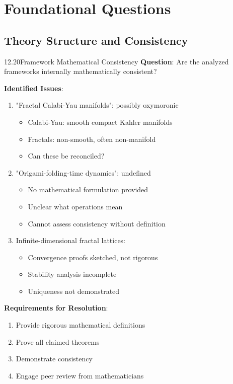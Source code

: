 \section{Foundational Questions}

\subsection{Theory Structure and Consistency}

\begin{openproblem}{12.20}{Framework Mathematical Consistency}
\textbf{Question}: Are the analyzed frameworks internally mathematically consistent?

\textbf{Identified Issues}:
\begin{enumerate}
    \item "Fractal Calabi-Yau manifolds": possibly oxymoronic
    \begin{itemize}
        \item Calabi-Yau: smooth compact Kahler manifolds
        \item Fractals: non-smooth, often non-manifold
        \item Can these be reconciled?
    \end{itemize}

    \item "Origami-folding-time dynamics": undefined
    \begin{itemize}
        \item No mathematical formulation provided
        \item Unclear what operations mean
        \item Cannot assess consistency without definition
    \end{itemize}

    \item Infinite-dimensional fractal lattices:
    \begin{itemize}
        \item Convergence proofs sketched, not rigorous
        \item Stability analysis incomplete
        \item Uniqueness not demonstrated
    \end{itemize}
\end{enumerate}

\textbf{Requirements for Resolution}:
\begin{enumerate}
    \item Provide rigorous mathematical definitions
    \item Prove all claimed theorems
    \item Demonstrate consistency
    \item Engage peer review from mathematicians
\end{enumerate}


\end{openproblem}
